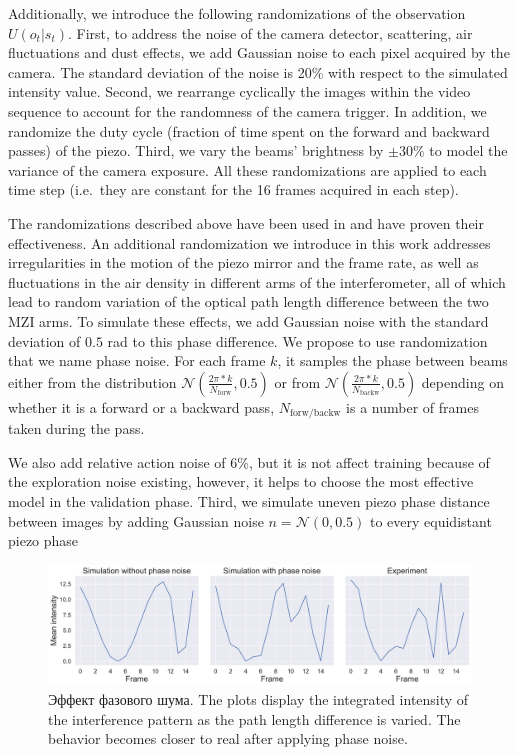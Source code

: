 Additionally, we introduce the following randomizations of the observation $U(o_t|s_t)$. First, to address the noise of the camera detector, scattering, air fluctuations and dust effects, we add Gaussian noise to each pixel acquired by the camera. The standard deviation of the noise is 20\% with respect to the simulated intensity value. %
Second, we rearrange cyclically the images within the video sequence to account for the randomness of the camera trigger. In addition, we randomize the duty cycle (fraction of time spent on the forward and backward passes) of the piezo. Third, we  vary the beams' brightness by $\pm 30\%$ to model the variance of the camera exposure.
All these randomizations are applied to each time step (i.e.~they are constant for the 16 frames acquired in each step).

The randomizations described above have  been used in and have proven their effectiveness. An additional randomization we introduce in this work addresses irregularities in the motion of the piezo mirror and the frame rate, as well as fluctuations in the air density in different arms of the interferometer, all of which lead to random variation of the optical path length difference between the two MZI arms. To simulate these effects, we add Gaussian noise with the standard deviation of $0.5$ rad to this phase difference. We propose to use randomization that we name phase noise. For each frame $k$, it samples the phase between beams either from the distribution $\mathcal{N}(\frac{2\pi * k}{N_{\mathrm{forw}}}, 0.5)$ or from $\mathcal{N}(\frac{2\pi * k}{N_{\mathrm{backw}}}, 0.5)$ depending on whether it is a forward or a backward pass, $N_{\mathrm{forw/backw}}$ is a number of frames taken during the pass.

We also add relative action noise of $6\%$, but it is not affect training because of the exploration noise existing, however, it helps to choose the most effective model in the validation phase.
Third, we simulate uneven piezo phase distance between images by adding Gaussian noise $n = \mathcal{N}(0, 0.5)$ to every equidistant piezo phase

\begin{figure}
  \includegraphics[width=1\linewidth]{images/Piezo_noise.pdf}
  \centering
  \caption{Эффект фазового шума. The plots display the integrated intensity of the interference pattern as the path length difference is varied. The behavior becomes closer to real after applying phase noise.}
  \label{fig:piezo_noise}
\end{figure}


